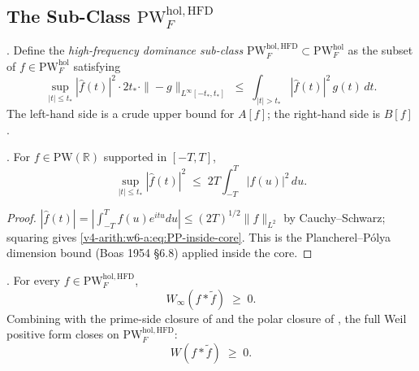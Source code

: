 \subsection{The Sub-Class \(\mathrm{PW}^{\mathrm{hol},\mathrm{HFD}}_{F}\)}
\label{v4-arith:w6-a:HFD-subclass:def}

\begin{definition}
\label{v4-arith:w6-a:def:HFD-class}
\ClaimStatusDefinitional. Define the \emph{high-frequency dominance
sub-class} \(\mathrm{PW}^{\mathrm{hol},\mathrm{HFD}}_{F}\subset\mathrm{PW}^{\mathrm{hol}}_{F}\)
as the subset of \(f\in\mathrm{PW}^{\mathrm{hol}}_{F}\) satisfying
\begin{equation}
\label{v4-arith:w6-a:eq:HFD-condition}
\sup_{|t|\leq t_{\ast}}|\widehat{f}(t)|^{2}\cdot 2t_{\ast}\cdot\|{-}g\|_{L^{\infty}[-t_{\ast},t_{\ast}]}
\;\leq\;
\int_{|t|>t_{\ast}}|\widehat{f}(t)|^{2}\,g(t)\,dt.
\end{equation}
The left-hand side is a crude upper bound for \(A[f]\); the right-hand
side is \(B[f]\).
\end{definition}

\begin{lemma}
\label{v4-arith:w6-a:lem:PP-bound}
\ClaimStatusProvedHere. For \(f\in\mathrm{PW}(\mathbb{R})\) supported
in \([-T,T]\),
\begin{equation}
\label{v4-arith:w6-a:eq:PP-inside-core}
\sup_{|t|\leq t_{\ast}}|\widehat{f}(t)|^{2}\;\leq\;2T\int_{-T}^{T}|f(u)|^{2}\,du.
\end{equation}
\end{lemma}

\begin{proof}
\(|\widehat{f}(t)|=|\int_{-T}^{T}f(u)e^{itu}du|\leq(2T)^{1/2}\|f\|_{L^{2}}\)
by Cauchy--Schwarz; squaring gives
\eqref{v4-arith:w6-a:eq:PP-inside-core}. This is the
Plancherel--P\'olya dimension bound (Boas 1954 \S6.8) applied inside
the core.
\end{proof}

\begin{theorem}
\label{v4-arith:w6-a:thm:HFD-ATP}
\ClaimStatusProvedHere. For every \(f\in\mathrm{PW}^{\mathrm{hol},\mathrm{HFD}}_{F}\),
\begin{equation}
\label{v4-arith:w6-a:eq:HFD-ATP-conclusion}
W_{\infty}(f*\widetilde{f})\;\geq\;0.
\end{equation}
Combining with the prime-side closure of
 and the polar closure of
, the full Weil positive form
closes on \(\mathrm{PW}^{\mathrm{hol},\mathrm{HFD}}_{F}\):
\begin{equation}
\label{v4-arith:w6-a:eq:HFD-Weil-positivity}
W(f*\widetilde{f})\;\geq\;0.
\end{equation}
\end{theorem}

